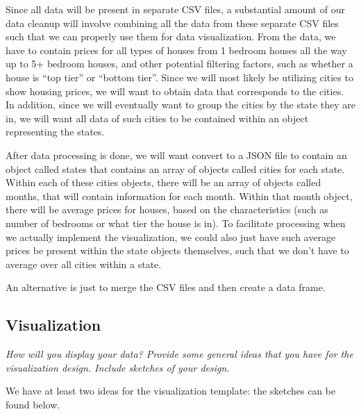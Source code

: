 \documentclass[12pt]{article}
\begin{document}
Since all data will be present in separate CSV files, a substantial amount of our data cleanup will involve combining all the data from these separate CSV files such that we can properly use them for data visualization. 
From the data, we have to contain prices for all types of houses from 1 bedroom houses all the way up to 5+ bedroom houses, and other potential filtering factors, such as whether a house is ``top tier'' or ``bottom tier''. Since we will most likely be utilizing cities to show housing prices, we will want to obtain data that corresponds to the cities. In addition, since we will eventually want to group the cities by the state they are in, we will want all data of such cities to be contained within an object representing the states.

After data processing is done, we will want convert to a JSON file to contain an object called states that contains an array of objects called cities for each state. Within each of these cities objects, there will be an array of objects called months, that will contain information for each month. Within that month object, there will be average prices for houses, based on the characteristics (such as number of bedrooms or what tier the house is in). To facilitate processing when we actually implement the visualization, we could also just have such average prices be present within the state objects themselves, such that we don't have to average over all cities within a state.

An alternative is just to merge the CSV files and then create a data frame.

\subsection*{Visualization}
\vspace{-3mm}
{\it How will you display your data? Provide some general ideas that you have for the visualization design. Include sketches of your design.}

We have at least two ideas for the visualization template: the sketches can be found below.
\end{document}
